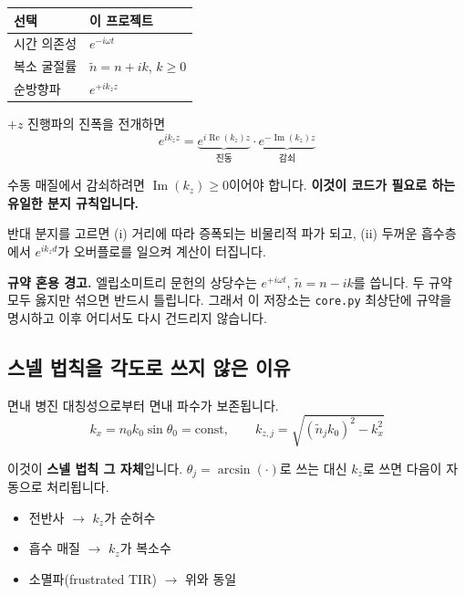 \documentclass[10pt,a4paper]{article}
\newcommand{\note}[1]{%
  \begin{tcolorbox}[enhanced,breakable,colback=white,colframe=accent,
    boxrule=0pt,leftrule=1.6pt,arc=0pt,outer arc=0pt,
    left=6pt,right=2pt,top=3pt,bottom=3pt,boxsep=0pt,
    before skip=5pt, after skip=8pt]
  #1
  \end{tcolorbox}}
\newcommand{\nt}{\tilde n}
\newcommand{\Imag}{\operatorname{Im}}
\newcommand{\Real}{\operatorname{Re}}
\begin{document}
\begin{center}
\begin{tabular}{@{}ll@{}}
\toprule
선택 & 이 프로젝트 \\
\midrule
시간 의존성 & $e^{-i\omega t}$ \\
복소 굴절률 & $\nt = n+ik$, $k\ge0$ \\
순방향파 & $e^{+ik_z z}$ \\
\bottomrule
\end{tabular}
\end{center}

$+z$ 진행파의 진폭을 전개하면
\begin{equation}
e^{ik_z z} = \underbrace{e^{i\Real(k_z)z}}_{\text{진동}}\cdot\underbrace{e^{-\Imag(k_z)z}}_{\text{감쇠}}
\end{equation}

수동 매질에서 감쇠하려면 $\Imag(k_z)\ge0$이어야 합니다. \textbf{이것이 코드가 필요로 하는 유일한 분지 규칙입니다.}

반대 분지를 고르면 (i) 거리에 따라 증폭되는 비물리적 파가 되고, (ii) 두꺼운 흡수층에서 $e^{ik_zd}$가 오버플로를 일으켜 계산이 터집니다.

\note{\textbf{규약 혼용 경고.} 엘립소미트리 문헌의 상당수는 $e^{+i\omega t}$, $\nt=n-ik$를 씁니다. 두 규약 모두 옳지만 섞으면 반드시 틀립니다. 그래서 이 저장소는 \texttt{core.py} 최상단에 규약을 명시하고 이후 어디서도 다시 건드리지 않습니다.}

\subsection{스넬 법칙을 각도로 쓰지 않은 이유}

면내 병진 대칭성으로부터 면내 파수가 보존됩니다.
\begin{equation}
k_x = n_0 k_0 \sin\theta_0 = \text{const},\qquad
k_{z,j} = \sqrt{(\nt_j k_0)^2 - k_x^2}
\end{equation}

이것이 \textbf{스넬 법칙 그 자체}입니다. $\theta_j = \arcsin(\cdot)$로 쓰는 대신 $k_z$로 쓰면 다음이 자동으로 처리됩니다.

\begin{itemize}[leftmargin=14pt,itemsep=1pt]
\item 전반사 $\to$ $k_z$가 순허수
\item 흡수 매질 $\to$ $k_z$가 복소수
\item 소멸파(frustrated TIR) $\to$ 위와 동일
\end{itemize}
\end{document}
